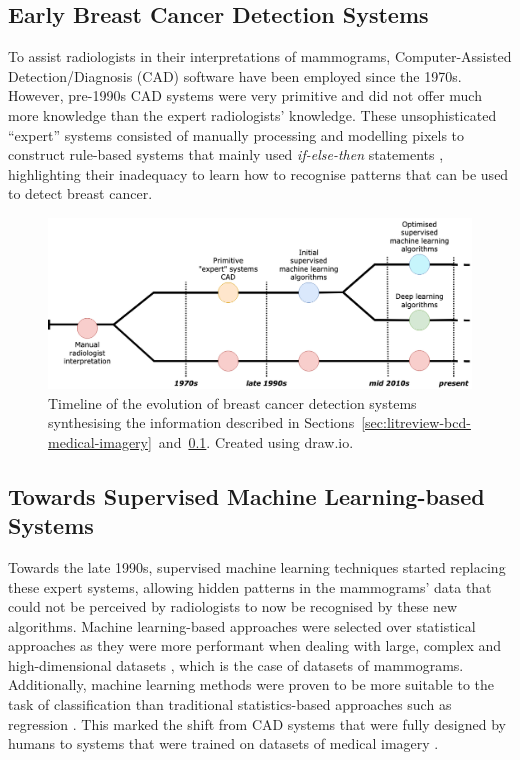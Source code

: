 \subsection{Early Breast Cancer Detection Systems}
\label{sec:litreview-bcd-early-cad}


To assist radiologists in their interpretations of mammograms, Computer-Assisted Detection/Diagnosis (CAD) software have been employed since the 1970s. However, pre-1990s CAD systems were very primitive and did not offer much more knowledge than the expert radiologists' knowledge. These unsophisticated ``expert'' systems consisted of manually processing and modelling pixels to construct rule-based systems that mainly used \textit{if-else-then} statements \cite{Litjens2017}, highlighting their inadequacy to learn how to recognise patterns that can be used to detect breast cancer.

\begin{figure}[ht]
\centerline{\includegraphics[width=\textwidth]{Dissertation/figures/litsurvey/bcd_timeline.png}}
\caption{\label{fig:litsurvey-bcd-timeline}Timeline of the evolution of breast cancer detection systems synthesising the information described in Sections~\ref{sec:litreview-bcd-medical-imagery}~and~\ref{sec:litreview-bcd-early-cad}. Created using draw.io.}
\end{figure}

\subsection{Towards Supervised Machine Learning-based Systems}

Towards the late 1990s, supervised machine learning techniques started replacing these expert systems, allowing hidden patterns in the mammograms' data that could not be perceived by radiologists to now be recognised by these new algorithms. Machine learning-based approaches were selected over statistical approaches as they were more performant when dealing with large, complex and high-dimensional datasets \cite{Yue2018}, which is the case of datasets of mammograms. Additionally, machine learning methods were proven to be more suitable to the task of classification than traditional statistics-based approaches such as regression \cite{Paliwal2009}. This marked the shift from CAD systems that were fully designed by humans to systems that were trained on datasets of medical imagery \cite{Litjens2017}.\\

